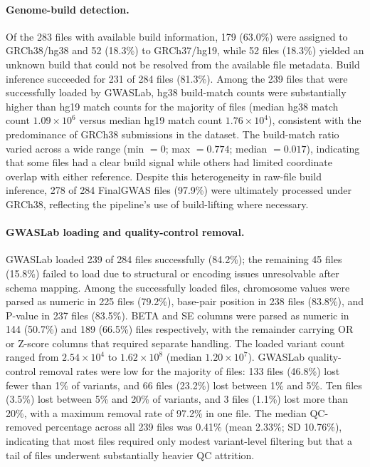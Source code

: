 \documentclass[11pt,a4paper]{article}
\begin{document}
\paragraph{Genome-build detection.}Of the 283 files with available build information, 179 (63.0\%) were assigned to GRCh38/hg38 and 52 (18.3\%) to GRCh37/hg19, while 52 files (18.3\%) yielded an unknown build that could not be resolved from the available file metadata. Build inference succeeded for 231 of 284 files (81.3\%). Among the 239 files that were successfully loaded by GWASLab, hg38 build-match counts were substantially higher than hg19 match counts for the majority of files (median hg38 match count $1.09 \times 10^{6}$ versus median hg19 match count $1.76 \times 10^{4}$), consistent with the predominance of GRCh38 submissions in the dataset. The build-match ratio varied across a wide range (min $= 0$; max $= 0.774$; median $= 0.017$), indicating that some files had a clear build signal while others had limited coordinate overlap with either reference. Despite this heterogeneity in raw-file build inference, 278 of 284 FinalGWAS files (97.9\%) were ultimately processed under GRCh38, reflecting the pipeline's use of build-lifting where necessary.

\paragraph{GWASLab loading and quality-control removal.}GWASLab loaded 239 of 284 files successfully (84.2\%); the remaining 45 files (15.8\%) failed to load due to structural or encoding issues unresolvable after schema mapping. Among the successfully loaded files, chromosome values were parsed as numeric in 225 files (79.2\%), base-pair position in 238 files (83.8\%), and P-value in 237 files (83.5\%). BETA and SE columns were parsed as numeric in 144 (50.7\%) and 189 (66.5\%) files respectively, with the remainder carrying OR or Z-score columns that required separate handling. The loaded variant count ranged from $2.54 \times 10^{4}$ to $1.62 \times 10^{8}$ (median $1.20 \times 10^{7}$). GWASLab quality-control removal rates were low for the majority of files: 133 files (46.8\%) lost fewer than 1\% of variants, and 66 files (23.2\%) lost between 1\% and 5\%. Ten files (3.5\%) lost between 5\% and 20\% of variants, and 3 files (1.1\%) lost more than 20\%, with a maximum removal rate of 97.2\% in one file. The median QC-removed percentage across all 239 files was 0.41\% (mean 2.33\%; SD 10.76\%), indicating that most files required only modest variant-level filtering but that a tail of files underwent substantially heavier QC attrition.
\end{document}
